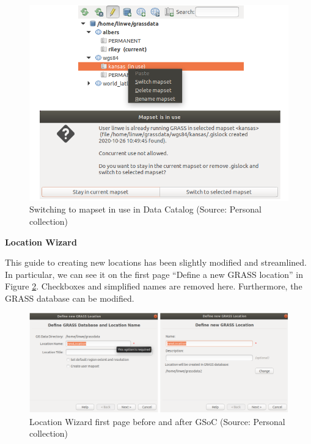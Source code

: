 \documentclass[a4paper,10pt,twoside]{article}
\begin{document}
\vspace{0.3cm}
\begin{figure}[hbt!] 
\begin{center}
\includegraphics[width=13cm]{../pictures/data_catalog_switch.png} 
\caption[Switching to mapset in use in Data Catalog]{Switching to mapset in use in Data Catalog (Source: Personal collection)}
\label{fig:data_catalog_switch_new}
\end{center}
\end{figure}


\bigskip
\noindent \textbf {Location Wizard}

\noindent This guide to creating new locations has been slightly modified and streamlined. In particular, we can see it on the first page ``Define a new GRASS location'' in Figure \ref{fig:loc_wiz_1}. Checkboxes and simplified names are removed here. Furthermore, the GRASS database can be modified.

\vspace{0.3cm}
\begin{figure}[hbt!] 
\begin{center}
\includegraphics[width=17cm]{../pictures/loc_wiz_1.png} 
\caption[Location Wizard first page before and after GSoC]{Location Wizard first page before and after GSoC (Source: Personal collection)}
\label{fig:loc_wiz_1}
\end{center}
\end{figure}
\end{document}
